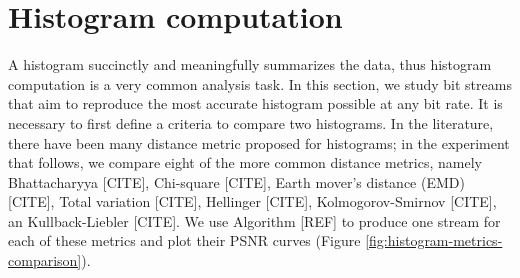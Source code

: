 
\section{Histogram computation}

A histogram succinctly and meaningfully summarizes the data, thus histogram computation is a very
common analysis task. In this section, we study bit streams that aim to reproduce the most accurate
histogram possible at any bit rate. It is necessary to first define a criteria to compare two
histograms. In the literature, there have been many distance metric proposed for histograms; in the
experiment that follows, we compare eight of the more common distance metrics, namely Bhattacharyya
[CITE], Chi-square [CITE], Earth mover's distance (EMD) [CITE], Total variation [CITE], Hellinger
[CITE], Kolmogorov-Smirnov [CITE], an Kullback-Liebler [CITE]. We use Algorithm [REF] to produce one
stream for each of these metrics and plot their PSNR curves (Figure
\ref{fig:histogram-metrics-comparison}).

